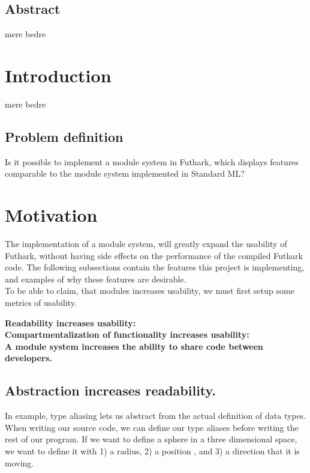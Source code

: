 \subsection{Abstract}
\label{subsec:abstract}
mere bedre

\section{Introduction}
\label{sec:introduction}
mere bedre

\subsection{Problem definition}
\label{subsec:probdef}
Is it possible to implement a module system in Futhark, which displays features
comparable to the module system implemented in Standard ML? \cite{sml modules}

\section{Motivation}
\label{subsec:label}
The implementation of a module system, will greatly expand the usability of
Futhark, without having side effects on the performance of the compiled Futhark code.
The following subsections contain the features this project is implementing, and
examples of why these features are desirable.\\

To be able to claim, that modules increases usability, we must first
setup some metrics of usability.

\textbf{Readability increases usability:}\\
\textbf{Compartmentalization of functionality increases usability:}\\
\textbf{A module system increases the ability to share code between developers.}

\subsection{Abstraction increases readability.} In example, type aliasing lets us abstract
from the actual definition of data types.
When writing our source code, we can define our type aliases before writing the
rest of our program.
If we want to define a sphere in a three dimensional space, we want to define it
with 1) a radius, 2) a position , and 3) a direction that it is
moving. 

